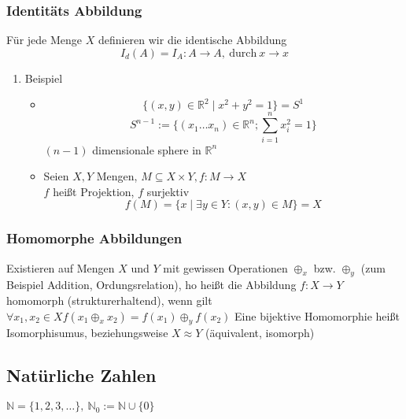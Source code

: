 \documentclass[11pt]{article}
\DeclareMathOperator{\Forall}{\forall}%
\begin{document}
\subsubsection{Identitäts Abbildung}
\label{sec-2-3-5}
Für jede Menge $X$ definieren wir die identische Abbildung \[I_d(A) = I_A: A\rightarrow A,~\text{durch}~x\rightarrow x\]
\begin{enumerate}
\item Beispiel
\label{sec-2-3-5-1}
\begin{itemize}
\item \[\{(x,y)\in\mathbb{R}^2\mid x^2 + y^2 = 1\} = S^1\] \[S^{n-1} := \{(x_1 \ldots x_n) \in \mathbb{R}^n; \sum_{i = 1}^n x_i^2 = 1\}\] $(n - 1)$ dimensionale sphere in $\mathbb{R}^n$
\item Seien $X,Y$ Mengen, $M\subseteq X\times Y, f:M\rightarrow X$ \\ $f$ heißt Projektion, $f$ surjektiv \[f(M) = \{x\mid \exists y \in Y : (x,y) \in M\} = X\]
\end{itemize}
\end{enumerate}
\subsubsection{Homomorphe Abbildungen}
\label{sec-2-3-6}
Existieren auf Mengen $X$ und $Y$ mit gewissen Operationen $\oplus_x$ bzw. $\oplus_y$ (zum Beispiel Addition, Ordungsrelation), ho heißt die Abbildung $f:X\to Y$ homomorph (strukturerhaltend), wenn gilt $\Forall x_1,x_2 \in X f(x_1\oplus_x x_2) = f(x_1)\oplus_y f(x_2)$
Eine bijektive Homomorphie heißt Isomorphisumus, beziehungsweise $X\approx Y$ (äquivalent, isomorph)
\subsection{Natürliche Zahlen}
\label{sec-2-4}
$\mathbb{N} = \{1,2,3,\ldots\},~\mathbb{N}_0 := \mathbb{N}\cup \{0\}$
\end{document}
